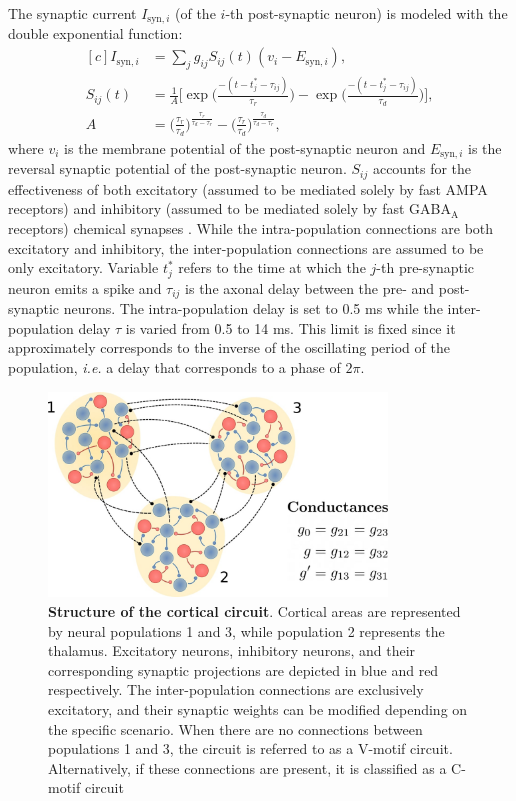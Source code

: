 \documentclass[../main.tex]{subfiles}
\begin{document}
The synaptic current $I_{\text{syn},i}$ (of the $i$-th post-synaptic neuron) is modeled with the double exponential function:
\begin{equation}
    \begin{aligned}[c]
        I_{\text{syn},i} &= \displaystyle\sum_{j}g_{ij}S_{ij}(t)(v_i-E_{\text{syn},i}),\\
        S_{ij}(t) &= \displaystyle\frac{1}{A}\Bigg[ \exp\Bigg(\displaystyle\frac{-(t-t_j^{*}-\tau_{ij})}{\tau_r}\Bigg)-
        \exp\Bigg(\displaystyle\frac{-(t-t_j^{*}-\tau_{ij})}{\tau_d}\Bigg)\Bigg], \\
        A &= \Bigg(\displaystyle\frac{\tau_r}{\tau_d}\Bigg)^{\frac{\tau_r}{\tau_d-\tau_r}} - \Bigg(\displaystyle\frac{\tau_r}{\tau_d}\Bigg)^{\frac{\tau_d}{\tau_d-\tau_r}},
    \end{aligned}
    \label{eq:double_exponential}
\end{equation}
where $v_i$ is the membrane potential of the post-synaptic neuron and $E_{\text{syn},i}$ is the reversal synaptic potential of the post-synaptic neuron.
$S_{ij}$ accounts for the effectiveness of both excitatory (assumed to be mediated solely by fast AMPA receptors) and inhibitory (assumed to be mediated solely by fast GABA$_{\text{A}}$ receptors) chemical synapses \citep{pariz_transmission_2021}.
While the intra-population connections are both excitatory and inhibitory, the inter-population connections are assumed to be only excitatory.
Variable $t_j^{*}$ refers to the time at which the $j$-th pre-synaptic neuron emits a spike and $\tau_{ij}$ is the axonal delay between the pre- and post-synaptic neurons.
The intra-population delay is set to 0.5 ms while the inter-population delay $\tau$ is varied from 0.5 to 14 ms.
This limit is fixed since it approximately corresponds to the inverse of the oscillating period of the population, \textit{i.e.} a delay that corresponds to a phase of $2\pi$.
\begin{figure}[htbp]
    \centering
    \includegraphics[width=90mm]{chapter2/figures/fig1}
    \caption{\textbf{Structure of the cortical circuit}.
    Cortical areas are represented by neural populations 1 and 3, while population 2 represents the thalamus.
    Excitatory neurons, inhibitory neurons, and their corresponding synaptic projections are depicted in blue and red respectively.
    The inter-population connections are exclusively excitatory, and their synaptic weights can be modified depending on the specific scenario.
    When there are no connections between populations 1 and 3, the circuit is referred to as a V-motif circuit.
    Alternatively, if these connections are present, it is classified as a C-motif circuit}
    \label{fig:vmotif}
\end{figure}
\end{document}
